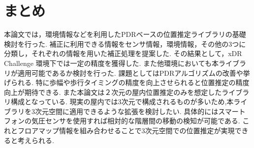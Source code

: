 

\section{まとめ}
本論文では，環境情報などを利用したPDRベースの位置推定ライブラリの基礎検討を行った.
補正に利用できる情報をセンサ情報，環境情報，その他の3つに分類し，それぞれの情報を用いた補正処理を提案した.
その結果として，xDR Challenge 環境下では一定の精度を獲得した.
また他環境においても本ライブラリが適用可能であるか検討を行った.
課題としてはPDRアルゴリズムの改善や挙げられる.
特に歩幅や歩行タイミングの精度を向上させられると位置推定の精度向上が期待できる.
また本論文は２次元の屋内位置推定のみを想定したライブラリ構成となっている.
現実の屋内では3次元で構成されるものが多いため,本ライブラリを3次元空間に適用できるような拡張を検討したい.
具体的にはスマートフォンの気圧センサを使用すれば相対的な階層間の移動の検知が可能である.
これとフロアマップ情報を組み合わせることで3次元空間での位置推定が実現できると考えられる.


